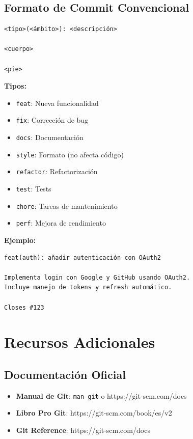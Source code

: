 \documentclass[
  doc,
  floatsintext,
  longtable,
  a4paper,
  nolmodern,
  notxfonts,
  notimes,
  12pt,
  colorlinks=true,linkcolor=blue,citecolor=blue,urlcolor=blue]{apa7}
\providecommand{\tightlist}{%
  \setlength{\itemsep}{0pt}\setlength{\parskip}{0pt}}
\begin{document}
\subsection{Formato de Commit
Convencional}\label{formato-de-commit-convencional}

\begin{verbatim}
<tipo>(<ámbito>): <descripción>

<cuerpo>

<pie>
\end{verbatim}

\textbf{Tipos:}

\begin{itemize}
\tightlist
\item
  \texttt{feat}: Nueva funcionalidad
\item
  \texttt{fix}: Corrección de bug
\item
  \texttt{docs}: Documentación
\item
  \texttt{style}: Formato (no afecta código)
\item
  \texttt{refactor}: Refactorización
\item
  \texttt{test}: Tests
\item
  \texttt{chore}: Tareas de mantenimiento
\item
  \texttt{perf}: Mejora de rendimiento
\end{itemize}

\textbf{Ejemplo:}

\begin{verbatim}
feat(auth): añadir autenticación con OAuth2

Implementa login con Google y GitHub usando OAuth2.
Incluye manejo de tokens y refresh automático.

Closes #123
\end{verbatim}

\section{Recursos Adicionales}\label{recursos-adicionales}

\subsection{Documentación Oficial}\label{documentaciuxf3n-oficial}

\begin{itemize}
\tightlist
\item
  \textbf{Manual de Git}: \texttt{man\ git} o https://git-scm.com/docs
\item
  \textbf{Libro Pro Git}: https://git-scm.com/book/es/v2
\item
  \textbf{Git Reference}: https://git-scm.com/docs
\end{itemize}
\end{document}
